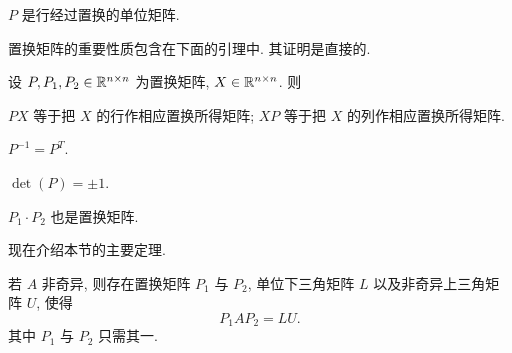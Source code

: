 \begin{definition}
\label{def:2-1}
 $P$ 是行经过置换的单位矩阵.
\end{definition}

置换矩阵的重要性质包含在下面的引理中. 其证明是直接的.

\begin{lemma}
\label{lem:2-1}
设 $P,P_1,P_2\in\mathbb{R}^{n\times n}$ 为置换矩阵, $X\in\mathbb{R}^{n\times n}$. 则
\begin{romanlist}
  \item $PX$ 等于把 $X$ 的行作相应置换所得矩阵; $XP$ 等于把 $X$ 的列作相应置换所得矩阵.
  \item $P^{-1}=P^T$.
  \item $\det(P)=\pm1$.
  \item $P_1\cdot P_2$ 也是置换矩阵.
\end{romanlist}
\end{lemma}

现在介绍本节的主要定理.

\begin{theorem}
\label{thm:2-3}
若 $A$ 非奇异, 则存在置换矩阵 $P_1$ 与 $P_2$, 单位下三角矩阵 $L$ 以及非奇异上三角矩阵 $U$, 使得
\[
  P_1AP_2=LU.
\]
其中 $P_1$ 与 $P_2$ 只需其一.
\end{theorem}

